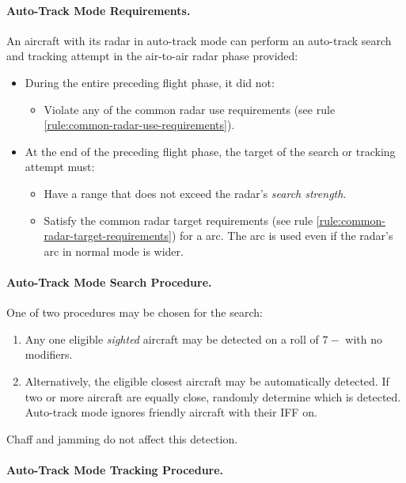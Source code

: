 \begin{advancedrules}
{\paragraph{Auto-Track Mode Requirements.} 
An aircraft with its radar in auto-track mode can perform an auto-track search and tracking attempt in the air-to-air radar phase provided:

\begin{itemize}

\item During the entire preceding flight phase, it did not:
\begin{itemize}
\item Violate any of the common radar use requirements (see rule \ref{rule:common-radar-use-requirements}).
\end{itemize}

\item At the end of the preceding flight phase, the target of the search or tracking attempt must:
\begin{itemize}
    \item Have a range that does not exceed the radar's \emph{search strength}.
    \item Satisfy the common radar target requirements (see rule \ref{rule:common-radar-target-requirements}) for a  arc. The  arc is used even if the radar's arc in normal mode is wider.
\end{itemize}

\end{itemize}


\paragraph{Auto-Track Mode Search Procedure.}

One of two procedures may be chosen for the search:
\begin{enumerate}
\item Any one eligible \emph{sighted} aircraft may be detected on a roll of $7-$ with no modifiers.
\item Alternatively, the eligible closest aircraft may be automatically detected. If two or more aircraft are equally close, randomly determine which is detected. Auto-track mode ignores friendly aircraft with their IFF on.
\end{enumerate}

Chaff and jamming do not affect this detection. 

\paragraph{Auto-Track Mode Tracking Procedure.}

}
\end{advancedrules}
